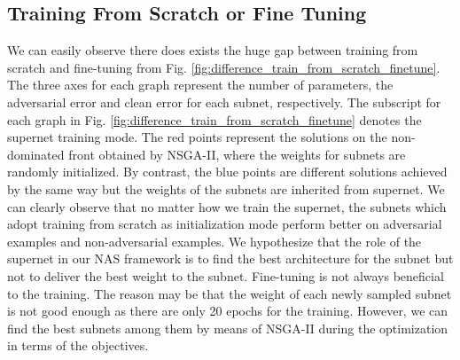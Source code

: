 \documentclass[journal]{IEEEtran}
\newcommand{\revised}[1]{{\color{black} #1}}
\begin{document}
\subsection{\textbf{Training From Scratch or Fine Tuning}}

\begin{figure*}[htb]
\centering
{}
\caption{Difference between training from scratch and fine-tuning. The red points represent the solutions on the non-dominated front obtained by NSGA-II, where the weights for subnets are randomly initialized. By contrast, the blue points are different solutions achieved by the same way but the weights of the subnets are inherited from supernet.}
\label{fig:difference_train_from_scratch_finetune}
\end{figure*}

We can easily observe there does exists the huge gap between training from scratch and fine-tuning from Fig. \ref{fig:difference_train_from_scratch_finetune}. The three axes for each graph represent the number of parameters, the adversarial error and clean error for each subnet, respectively. The subscript for each graph in Fig. \ref{fig:difference_train_from_scratch_finetune} denotes the supernet training mode. The red points represent the solutions on the non-dominated front obtained by NSGA-II, where the weights for subnets are randomly initialized. By contrast, the blue points are different solutions achieved by the same way but the weights of the subnets are inherited from supernet. We can clearly observe that no matter how we train the supernet, the subnets which \revised{adopt} training from scratch as initialization mode perform better on adversarial examples and non-adversarial examples. We hypothesize that the role of the supernet in our NAS framework is to find the best architecture for the subnet but not to deliver the best weight to the subnet. Fine-tuning is not always beneficial to the training. The reason may be that the weight of each newly sampled subnet is not good enough as there are only 20 epochs for the training. However, we can find the best subnets among them by means of NSGA-II during the optimization in terms of the objectives.
\end{document}
